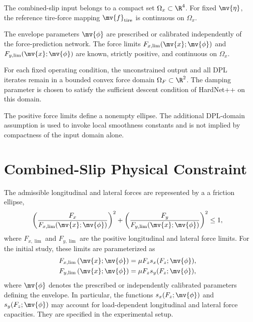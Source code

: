 \begin{assum}
	\label{Tire:assum:compact}
	The combined-slip input belongs to a compact set
	$\Omega_x\subset\R^4$. For fixed $\mv{\eta}$, the reference
	tire-force mapping $\mv{f}_{\mathrm{tire}}$ is continuous on
	$\Omega_x$.
\end{assum}

\begin{assum}
	\label{Tire:assum:envelope}
	The envelope parameters $\mv{\phi}$ are prescribed or calibrated
	independently of the force-prediction network. The force limits
	$F_{x,\lim}(\mv{x};\mv{\phi})$ and $F_{y,\lim}(\mv{x};\mv{\phi})$
	are known, strictly positive, and continuous on $\Omega_x$.
\end{assum}

\begin{assum}
	\label{Tire:assum:dpl:domain}
	For each fixed operating condition, the unconstrained output and all
	DPL iterates remain in a bounded convex force domain
	$\Omega_F\subset\R^2$. The damping parameter is chosen to satisfy
	the sufficient descent condition of HardNet++ on this domain.
\end{assum}

The positive force limits define a nonempty ellipse. The additional DPL-domain
assumption is used to invoke local smoothness constants and is not implied by
compactness of the input domain alone.

\section{Combined-Slip Physical Constraint}
\label{Tire:sec:physical:constraints}

The admissible longitudinal and lateral forces are represented by a a friction
ellipse,
\begin{equation}
	\label{Tire:eq:friction:ellipse}
	\left(
	\frac{
			F_x
		}{
			F_{x,\lim}(\mv{x};\mv{\phi})
		}
	\right)^2
	+
	\left(
	\frac{
			F_y
		}{
			F_{y,\lim}(\mv{x};\mv{\phi})
		}
	\right)^2
	\leq
	1
	,
\end{equation}
where $F_{x,\lim}$ and $F_{y,\lim}$ are the positive longitudinal
and lateral force limits. For the initial study, these limits are
parameterized as
\begin{equation}
	\label{Tire:eq:force:limits}
	\begin{aligned}
		F_{x,\lim}
		\left(
		\mv{x};\mv{\phi}
		\right)
		 & =
		\mu F_z s_x(F_z;\mv{\phi})
		,
		\\
		F_{y,\lim}
		\left(
		\mv{x};\mv{\phi}
		\right)
		 & =
		\mu F_z s_y(F_z;\mv{\phi})
		,
	\end{aligned}
\end{equation}
where $\mv{\phi}$ denotes the prescribed or independently calibrated
parameters defining the envelope. In particular, the functions
$s_x(F_z;\mv{\phi})$ and $s_y(F_z;\mv{\phi})$ may account for
load-dependent longitudinal and lateral force capacities. They are
specified in the experimental setup.

